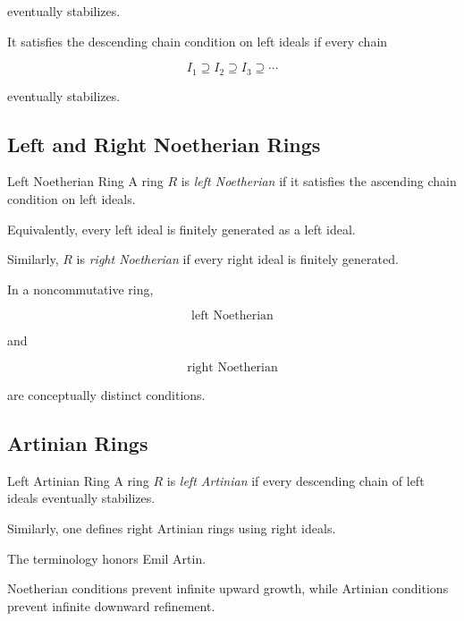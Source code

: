 eventually stabilizes.

It satisfies the descending chain condition on left ideals if every chain

\[ I_1\supseteq I_2\supseteq I_3\supseteq\cdots \]

eventually stabilizes.

\subsection{Left and Right Noetherian Rings}
\label{subsec:left-right-noetherian}

\begin{definitionbox}{Left Noetherian Ring}
A ring \(R\) is \emph{left Noetherian} if it satisfies the ascending chain
condition on left ideals.
\end{definitionbox}

Equivalently, every left ideal is finitely generated as a left ideal.

Similarly, \(R\) is \emph{right Noetherian} if every right ideal is finitely
generated.

In a noncommutative ring,

\[ \text{left Noetherian} \]

and

\[ \text{right Noetherian} \]

are conceptually distinct conditions.

\subsection{Artinian Rings}
\label{subsec:artinian-rings}

\begin{definitionbox}{Left Artinian Ring}
A ring \(R\) is \emph{left Artinian} if every descending chain of left ideals
eventually stabilizes.
\end{definitionbox}

Similarly, one defines right Artinian rings using right ideals.

The terminology honors Emil Artin.

Noetherian conditions prevent infinite upward growth, while Artinian
conditions prevent infinite downward refinement.

